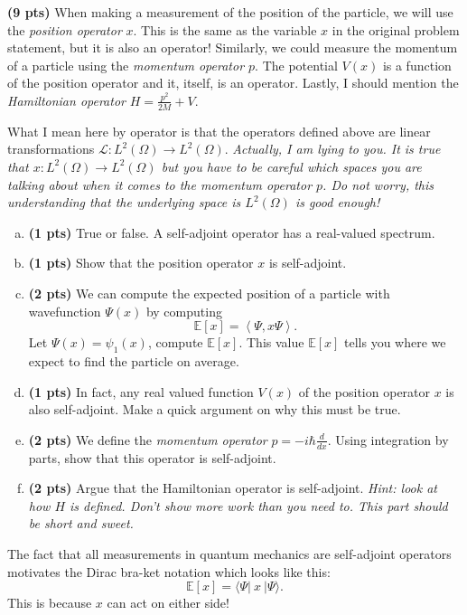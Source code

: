 \documentclass[12pt]{article} %
\newcommand{\innprod}[2]{\left\langle #1, #2\right\rangle}
\begin{document}
\newpage
\begin{problem}
\textbf{(9 pts)}  When making a measurement of the position of the particle, we will use the \emph{position operator} $x$.  This is the same as the variable $x$ in the original problem statement, but it is also an operator! Similarly, we could measure the momentum of a particle using the \emph{momentum operator $p$}. The potential $V(x)$ is a function of the position operator and it, itself, is an operator. Lastly, I should mention the \emph{Hamiltonian operator} $H=\frac{p^2}{2M} + V$. 

What I mean here by operator is that the operators defined above are linear transformations $\mathcal{L} \colon L^2(\Omega) \to L^2(\Omega)$. \emph{Actually, I am lying to you. It is true that $x\colon L^2(\Omega) \to L^2(\Omega)$ but you have to be careful which spaces you are talking about when it comes to the momentum operator $p$. Do not worry, this understanding that the underlying space is $L^2(\Omega)$ is good enough!}
   \begin{enumerate}[(a)]
		\item \textbf{(1 pts)} True or false. A self-adjoint operator has a real-valued spectrum.
   		\item \textbf{(1 pts)} Show that the position operator $x$ is self-adjoint.
   		\item \textbf{(2 pts)} We can compute the expected position of a particle with wavefunction $\Psi(x)$ by computing
   		\[
   		\mathbb{E}[x]=\innprod{\Psi}{x\Psi}.
   		\]
   		Let $\Psi(x) = \psi_1(x)$, compute $\mathbb{E}[x]$. This value $\mathbb{E}[x]$ tells you where we expect to find the particle on average. 
        \item \textbf{(1 pts)} In fact, any real valued function $V(x)$ of the position operator $x$ is also self-adjoint. Make a quick argument on why this must be true.
		\item \textbf{(2 pts)} We define the \emph{momentum operator} $p = -i\hbar \frac{d}{dx}$. Using integration by parts, show that this operator is self-adjoint.
		\item \textbf{(2 pts)} Argue that the Hamiltonian operator is self-adjoint. \emph{Hint: look at how $H$ is defined. Don't show more work than you need to. This part should be short and sweet.}
   	\end{enumerate}
\end{problem}
\begin{remark}
The fact that all measurements in quantum mechanics are self-adjoint operators motivates the Dirac bra-ket notation which looks like this:
\[
\mathbb{E}[x] = \langle \Psi \vert ~x~ \vert \Psi \rangle.
\]
This is because $x$ can act on either side!
\end{remark}
\end{document}
